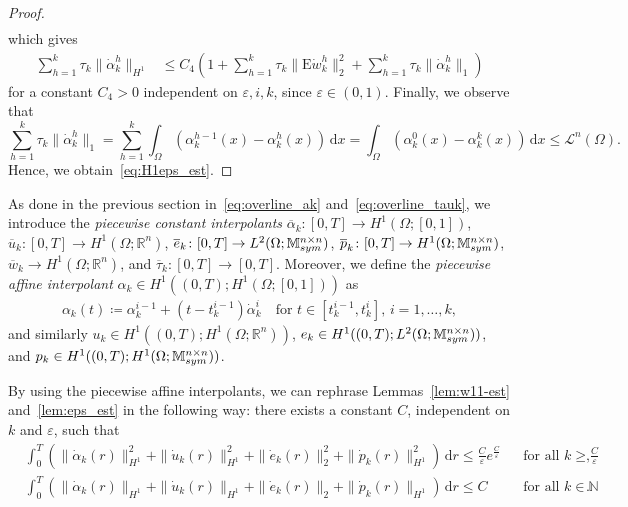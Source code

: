 \documentclass[reqno]{amsart}
\theoremstyle{definition}
\numberwithin{equation}{section}
\def\de {\mathrm{d}}
\def\R {\mathbb R}
\def\N {\mathbb N}
\def\M {\mathbb M^{n\times n}_{\rm sym}}
\def\EE {\mathrm{E}}
\begin{document}
\begin{proof}
\begin{align*}
\end{align*}
which gives
\begin{align*}
\sum_{h=1}^k\tau_k\|\dot\alpha_k^h\|_{H^1}&\le C_4\left(1+\sum_{h=1}^k\tau_k\|\EE \dot w_k^h\|_2^2+\sum_{h=1}^k\tau_k\|\dot\alpha_k^h\|_1\right)
\end{align*}
for a constant $C_4>0$ independent on $\varepsilon,i,k$, since $\varepsilon\in(0,1)$. Finally, we observe that 
$$\sum_{h=1}^k\tau_k\|\dot\alpha_k^h\|_1=\sum_{h=1}^k\int_\Omega(\alpha_k^{h-1}(x)-\alpha_k^h(x))\,\de x=\int_\Omega (\alpha_k^0(x)-\alpha_k^k(x))\,\de x\le \mathcal L^n(\Omega).$$
Hence, we obtain~\eqref{eq:H1eps_est}.
\end{proof}

As done in the previous section in~\eqref{eq:overline_ak} and~\eqref{eq:overline_tauk}, we introduce the {\it piecewise constant interpolants} $\overline \alpha_k\colon [0,T]\to H^1(\Omega;[0,1])$, $\overline u_k\colon [0,T]\to H^1(\Omega;\R^n)$, $\overline e_k\colon [0,T]\to L^2(\Omega;\M)$, $\overline p_k\colon [0,T]\to H^1(\Omega;\M)$, $\overline w_k\to H^1(\Omega;\R^n)$, and $\overline \tau_k\colon [0,T]\to [0,T]$. Moreover, we define the {\it piecewise affine interpolant}  $\alpha_k\in H^1((0,T);H^1(\Omega;[0,1]))$ as
\begin{align*}
\alpha_k(t)\coloneqq \alpha_k^{i-1}+(t-t_k^{i-1})\dot \alpha_k^i\quad\text{for $t\in [t_k^{i-1},t_k^i]$, $i=1,\dots,k$},
\end{align*}
and similarly $u_k\in H^1((0,T);H^1(\Omega;\R^n))$, $e_k\in H^1((0,T);L^2(\Omega;\M))$, and $p_k\in H^1((0,T);H^1(\Omega;\M))$. 

By using the piecewise affine interpolants, we can rephrase Lemmas~\ref{lem:w11-est} and~\ref{lem:eps_est} in the following way: there exists a constant $C$, independent on $k$ and $\varepsilon$, such that
\begin{align}
&\int_0^T\left(\|\dot \alpha_k(r)\|_{H^1}^2+\|\dot u_k(r)\|_{H^1}^2+\|\dot e_k(r)\|_2^2+\|\dot p_k(r)\|_ {H^1}^2\right) \,\de r\le \frac{C}{\varepsilon}e^\frac{C}{\varepsilon}& &\text{for all $k\ge \frac{C}{\varepsilon}$},\label{eq:k_unif_bound}\\
&\int_0^T\left(\|\dot \alpha_k(r)\|_{H^1}+\|\dot u_k(r)\|_{H^1}+\|\dot e_k(r)\|_2+\|\dot p_k(r)\|_ {H^1}\right) \,\de r\le C& &\text{for all $k\in\N$}. \label{eq:k_unif_bound2}
\end{align}

\end{document}
